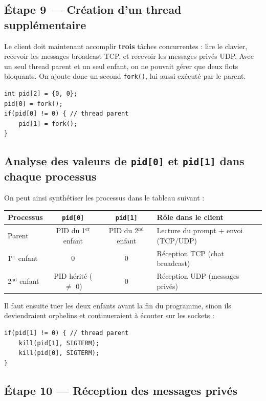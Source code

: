 \documentclass[a4paper,12pt,french]{article}
\begin{document}
\pagebreak
\subsection{Étape 9 — Création d'un thread supplémentaire}

Le client doit maintenant accomplir \textbf{trois} tâches concurrentes : lire le clavier,
recevoir les messages broadcast TCP, et recevoir les messages privés UDP. Avec un seul
thread parent et un seul enfant, on ne pouvait gérer que deux flots bloquants. On ajoute
donc un second \texttt{fork()}, lui aussi exécuté par le parent.

\begin{verbatim}
int pid[2] = {0, 0};
pid[0] = fork();
if(pid[0] != 0) { // thread parent
    pid[1] = fork();
}
\end{verbatim}

\subsection*{Analyse des valeurs de \texttt{pid[0]} et \texttt{pid[1]} dans chaque processus}

On peut ainsi synthétiser les processus dans le tableau suivant :

\begin{center}
\begin{tabular}{l|c|c|l}
\textbf{Processus} & \texttt{pid[0]} & \texttt{pid[1]} & \textbf{Rôle dans le client} \\
\hline
Parent              & PID du 1$^{\text{er}}$ enfant & PID du 2$^{\text{nd}}$ enfant & Lecture du prompt + envoi (TCP/UDP) \\
1$^{\text{er}}$ enfant & 0 & 0 & Réception TCP (chat broadcast) \\
2$^{\text{nd}}$ enfant & PID hérité ($\neq$ 0) & 0 & Réception UDP (messages privés) \\
\end{tabular}
\end{center}

Il faut ensuite tuer les deux enfants avant la fin du programme, sinon ils deviendraient orphelins et continueraient à écouter sur les sockets :
\begin{verbatim}
if(pid[1] != 0) { // thread parent
    kill(pid[1], SIGTERM);
    kill(pid[0], SIGTERM);
}
\end{verbatim}

\pagebreak
\subsection{Étape 10 — Réception des messages privés}
\end{document}
